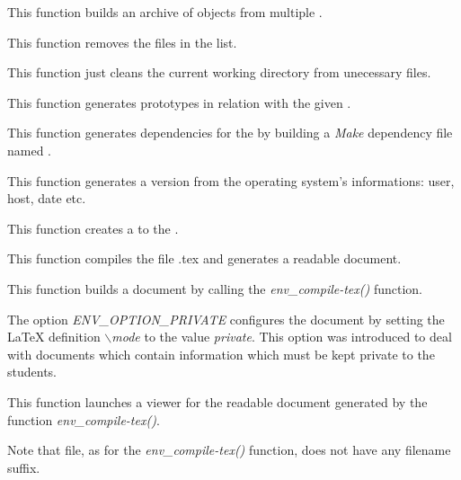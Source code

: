          {
	   This function builds an archive of objects from multiple
	   .
	 }

         {
	   This function removes the files in the list.
	 }

         {
	   This function just cleans the current working directory from
	   unecessary files.
	 }

         {
	   This function generates prototypes in relation with the given
	   .
	 }

         {
	   This function generates dependencies for the 
	   by building a \textit{Make} dependency file named .
	 }

         {
	   This function generates a version  from the operating
	   system's informations: user, host, date etc.
	 }

         {
	   This function creates a  to the .
	 }

         {
	   This function compiles the file .tex and
	   generates a readable document.
	 }

         {
	   This function builds a document by calling the
           \textit{env\_compile-tex()} function.

	   \-

           The option \textit{ENV\_OPTION\_PRIVATE} configures the document
	   by setting the {\LaTeX} definition \textit{$\backslash$mode} to
	   the value \textit{private}. This option was introduced to deal with
	   documents which contain information which must be kept private to
	   the students.
	 }

         {
	   This function launches a viewer for the readable document
	   generated by the function \textit{env\_compile-tex()}.

	   \-

	   Note that file, as for the \textit{env\_compile-tex()} function,
	   does not have any filename suffix.
	 }

